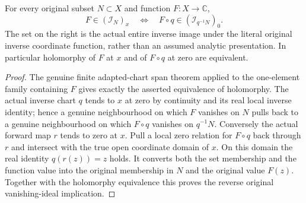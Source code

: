 \begin{lemma}
\label{hir:actual-singular-chart-vanishing-membership}
\leanok
For every original subset $N\subset X$ and function $F:X\to\mathbb C$,
\[
 F\in(\mathcal I_N)_x\quad\Longleftrightarrow\quad
 F\circ q\in(\mathcal I_{q^{-1}N})_0.
\]
The set on the right is the actual entire inverse image under the literal
original inverse coordinate function, rather than an assumed analytic
presentation. In particular holomorphy of $F$ at $x$ and of $F\circ q$
at zero are equivalent.
\end{lemma}
\begin{proof}
The genuine finite adapted-chart span theorem applied to the one-element
family containing $F$ gives exactly the asserted equivalence of
holomorphy. The actual inverse chart $q$ tends to $x$ at zero by
continuity and its real local inverse identity; hence a genuine
neighbourhood on which $F$ vanishes on $N$ pulls back to a genuine
neighbourhood on which $F\circ q$ vanishes on $q^{-1}N$.
Conversely the actual forward map $r$ tends to zero at $x$.
Pull a local zero relation for $F\circ q$ back through $r$ and intersect
with the true open coordinate domain of $x$. On this domain the real
identity $q(r(z))=z$ holds. It converts both the set membership and the
function value into the original membership in $N$ and the original
value $F(z)$. Together with the holomorphy equivalence this proves the
reverse original vanishing-ideal implication.
\end{proof}

